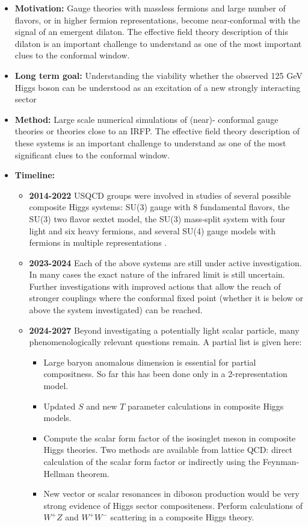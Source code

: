 \documentclass[12pt,hyperpdf]{article}
\begin{document}


\begin{itemize}
\item{ \bf Motivation:} Gauge theories with massless fermions and large
  number of flavors, or in higher fermion representations, become
  near-conformal with the signal of an emergent dilaton. The effective
  field theory description of this dilaton is an important challenge
  to understand as one of the most important clues to the conformal
  window. 
  \item { \bf Long term goal:} Understanding the viability whether the
     observed 125 GeV Higgs boson can be understood as an excitation of
     a new strongly interacting sector
\item {\bf Method:} Large scale numerical simulations of (near)-
     conformal gauge theories or theories close to an IRFP.  
     The effective field theory description of these systems 
     is an important challenge to understand as one of the most
    significant clues to the conformal window. 
\item{\bf Timeline:}
\begin{itemize}
   \item{\bf 2014-2022} USQCD groups were involved in studies of several possible composite Higgs systems: SU(3) gauge with 8 fundamental flavors, the SU(3) two flavor sextet model, the SU(3)  mass-split system with four light and six heavy fermions, and several SU(4) gauge models with fermions in multiple representations \cite{Fodor:2020niv,LatticeStrongDynamics:2020uwo,Hasenfratz:2023sqa,LSD:2023uzj}. 
   \item{\bf 2023-2024} Each of the above systems are still under active investigation. In many cases the exact nature of the infrared limit is still uncertain. Further investigations with improved actions that allow the reach of stronger couplings where the conformal fixed point (whether it is below or above the system investigated) can be reached.
   \item{\bf 2024-2027} Beyond investigating a potentially light scalar particle, many phenomenologically relevant questions remain. A partial list is given here:
   \begin{itemize}
       \item Large baryon anomalous dimension is essential for partial compositness. So far this has been done  only in a 2-representation model. \cite{Hasenfratz:2023sqa}
       \item Updated $S$ and new $T$ parameter calculations in composite Higgs models.
       \item Compute the scalar form factor of the isosinglet meson in composite Higgs theories. Two methods are available from lattice QCD: direct calculation of the scalar form factor or indirectly using the Feynman-Hellman theorem.
       \item New vector or scalar resonances in diboson production would be very strong evidence of Higgs sector compositeness. Perform calculations of $W^+ Z$ and $W^+ W^-$ scattering in a composite Higgs theory.
   \end{itemize}
\end{itemize}
\end{itemize}
\end{document}
